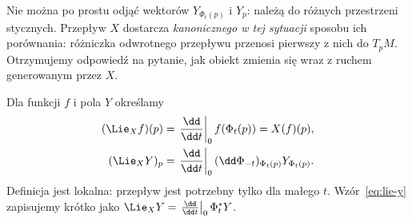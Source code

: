 Nie można po prostu odjąć wektorów $Y_{\Phi_t(p)}$ i $Y_p$:
należą do różnych przestrzeni stycznych. Przepływ $X$ dostarcza
\emph{kanonicznego w tej sytuacji} sposobu ich porównania:
różniczka odwrotnego przepływu przenosi pierwszy z nich do $T_pM$.
Otrzymujemy odpowiedź na pytanie, jak obiekt zmienia się
wraz z ruchem generowanym przez $X$.

\begin{definicja}\label{def:pochodna-liego}
Dla funkcji $f$ i pola $Y$ określamy
\begin{align}
 (\Lie_Xf)(p)
 &=\left.\frac{\dd}{\dd t}\right|_{0}f(\Phi_t(p))=X(f)(p),
 \label{eq:lie-f}\\
 (\Lie_XY)_p
 &=\left.\frac{\dd}{\dd t}\right|_{0}
 (\dd\Phi_{-t})_{\Phi_t(p)}Y_{\Phi_t(p)}.
 \label{eq:lie-y}
\end{align}
Definicja jest lokalna: przepływ jest potrzebny tylko dla małego $t$.
Wzór~\eqref{eq:lie-y} zapisujemy krótko jako
$\Lie_XY=\left.\frac{\dd}{\dd t}\right|_0\Phi_t^*Y$.
\end{definicja}


